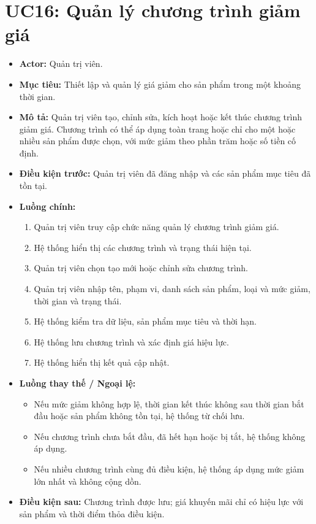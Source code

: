 \section{UC16: Quản lý chương trình giảm giá}
\begin{itemize}
    \item \textbf{Actor:} Quản trị viên.
    \item \textbf{Mục tiêu:} Thiết lập và quản lý giá giảm cho sản phẩm trong một khoảng thời gian.
    \item \textbf{Mô tả:} Quản trị viên tạo, chỉnh sửa, kích hoạt hoặc kết thúc chương trình giảm giá. Chương trình có thể áp dụng toàn trang hoặc chỉ cho một hoặc nhiều sản phẩm được chọn, với mức giảm theo phần trăm hoặc số tiền cố định.
    \item \textbf{Điều kiện trước:} Quản trị viên đã đăng nhập và các sản phẩm mục tiêu đã tồn tại.
    \item \textbf{Luồng chính:}
    \begin{enumerate}
        \item Quản trị viên truy cập chức năng quản lý chương trình giảm giá.
        \item Hệ thống hiển thị các chương trình và trạng thái hiện tại.
        \item Quản trị viên chọn tạo mới hoặc chỉnh sửa chương trình.
        \item Quản trị viên nhập tên, phạm vi, danh sách sản phẩm, loại và mức giảm, thời gian và trạng thái.
        \item Hệ thống kiểm tra dữ liệu, sản phẩm mục tiêu và thời hạn.
        \item Hệ thống lưu chương trình và xác định giá hiệu lực.
        \item Hệ thống hiển thị kết quả cập nhật.
    \end{enumerate}
    \item \textbf{Luồng thay thế / Ngoại lệ:}
    \begin{itemize}
        \item Nếu mức giảm không hợp lệ, thời gian kết thúc không sau thời gian bắt đầu hoặc sản phẩm không tồn tại, hệ thống từ chối lưu.
        \item Nếu chương trình chưa bắt đầu, đã hết hạn hoặc bị tắt, hệ thống không áp dụng.
        \item Nếu nhiều chương trình cùng đủ điều kiện, hệ thống áp dụng mức giảm lớn nhất và không cộng dồn.
    \end{itemize}
    \item \textbf{Điều kiện sau:} Chương trình được lưu; giá khuyến mãi chỉ có hiệu lực với sản phẩm và thời điểm thỏa điều kiện.

\end{itemize}

